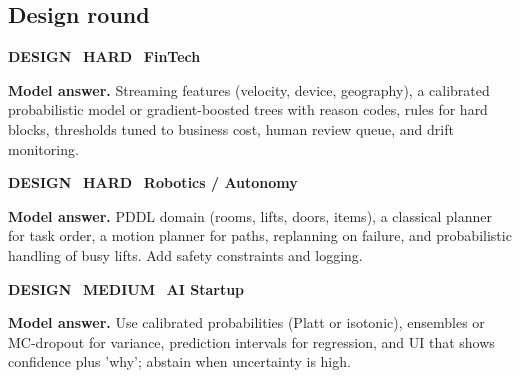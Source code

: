\documentclass[11pt]{article}
\begin{document}
\subsection*{\color{crimson}Design round}
\begin{tcolorbox}[enhanced,breakable,colback=white,colframe=crimson,arc=2mm,boxrule=0.8pt,left=3mm,right=3mm,
 title={\textbf{QIV.10}\quad Design a real-time fraud-scoring system that must explain its decisions.},fonttitle=\color{white}\small,colbacktitle=crimson]
\colorbox{crimson!15}{\scriptsize\bfseries\color{crimson} DESIGN}\
\colorbox{crimson!15}{\scriptsize\bfseries\color{crimson} HARD}\
\colorbox{navy!8}{\scriptsize\bfseries\color{navy} FinTech}\par\smallskip
\textbf{\color{navy}Model answer.} Streaming features (velocity, device, geography), a calibrated probabilistic model or gradient-boosted trees with reason codes, rules for hard blocks, thresholds tuned to business cost, human review queue, and drift monitoring.
\end{tcolorbox}
\begin{tcolorbox}[enhanced,breakable,colback=white,colframe=crimson,arc=2mm,boxrule=0.8pt,left=3mm,right=3mm,
 title={\textbf{QIV.11}\quad Design the task planner for a hospital delivery robot.},fonttitle=\color{white}\small,colbacktitle=crimson]
\colorbox{crimson!15}{\scriptsize\bfseries\color{crimson} DESIGN}\
\colorbox{crimson!15}{\scriptsize\bfseries\color{crimson} HARD}\
\colorbox{navy!8}{\scriptsize\bfseries\color{navy} Robotics / Autonomy}\par\smallskip
\textbf{\color{navy}Model answer.} PDDL domain (rooms, lifts, doors, items), a classical planner for task order, a motion planner for paths, replanning on failure, and probabilistic handling of busy lifts. Add safety constraints and logging.
\end{tcolorbox}
\begin{tcolorbox}[enhanced,breakable,colback=white,colframe=crimson,arc=2mm,boxrule=0.8pt,left=3mm,right=3mm,
 title={\textbf{QIV.12}\quad How would you add uncertainty estimates to a model's predictions shown to users?},fonttitle=\color{white}\small,colbacktitle=crimson]
\colorbox{crimson!15}{\scriptsize\bfseries\color{crimson} DESIGN}\
\colorbox{gold!85!black!15}{\scriptsize\bfseries\color{gold!85!black} MEDIUM}\
\colorbox{navy!8}{\scriptsize\bfseries\color{navy} AI Startup}\par\smallskip
\textbf{\color{navy}Model answer.} Use calibrated probabilities (Platt or isotonic), ensembles or MC-dropout for variance, prediction intervals for regression, and UI that shows confidence plus 'why'; abstain when uncertainty is high.
\end{tcolorbox}
\end{document}
